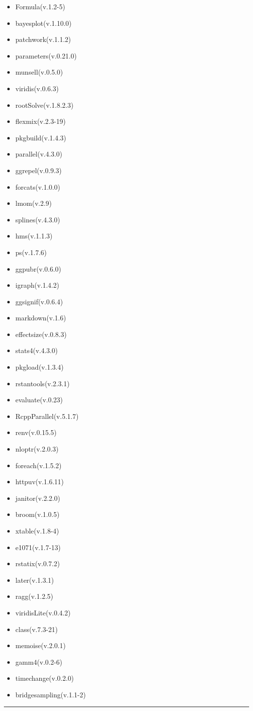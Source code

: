 \documentclass[
]{article}
\begin{document}
\begin{itemize}
\item
  Formula(v.1.2-5)
\item
  bayesplot(v.1.10.0)
\item
  patchwork(v.1.1.2)
\item
  parameters(v.0.21.0)
\item
  munsell(v.0.5.0)
\item
  viridis(v.0.6.3)
\item
  rootSolve(v.1.8.2.3)
\item
  flexmix(v.2.3-19)
\item
  pkgbuild(v.1.4.3)
\item
  parallel(v.4.3.0)
\item
  ggrepel(v.0.9.3)
\item
  forcats(v.1.0.0)
\item
  lmom(v.2.9)
\item
  splines(v.4.3.0)
\item
  hms(v.1.1.3)
\item
  ps(v.1.7.6)
\item
  ggpubr(v.0.6.0)
\item
  igraph(v.1.4.2)
\item
  ggsignif(v.0.6.4)
\item
  markdown(v.1.6)
\item
  effectsize(v.0.8.3)
\item
  stats4(v.4.3.0)
\item
  pkgload(v.1.3.4)
\item
  rstantools(v.2.3.1)
\item
  evaluate(v.0.23)
\item
  RcppParallel(v.5.1.7)
\item
  renv(v.0.15.5)
\item
  nloptr(v.2.0.3)
\item
  foreach(v.1.5.2)
\item
  httpuv(v.1.6.11)
\item
  janitor(v.2.2.0)
\item
  broom(v.1.0.5)
\item
  xtable(v.1.8-4)
\item
  e1071(v.1.7-13)
\item
  rstatix(v.0.7.2)
\item
  later(v.1.3.1)
\item
  ragg(v.1.2.5)
\item
  viridisLite(v.0.4.2)
\item
  class(v.7.3-21)
\item
  memoise(v.2.0.1)
\item
  gamm4(v.0.2-6)
\item
  timechange(v.0.2.0)
\item
  bridgesampling(v.1.1-2)
\end{itemize}

\begin{center}\rule{0.5\linewidth}{0.5pt}\end{center}
\end{document}
